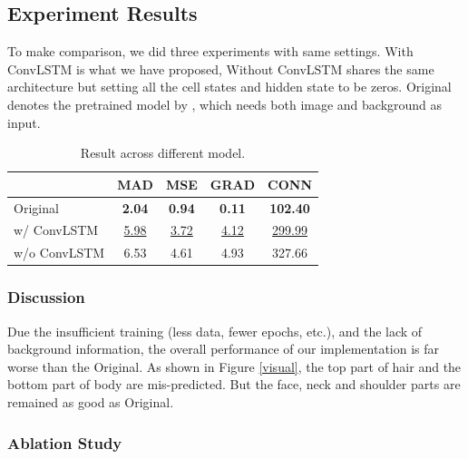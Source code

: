\documentclass[final]{cvpr}
\begin{document}
\subsection{Experiment Results}

To make comparison, we did three experiments with same settings.
With ConvLSTM is what we have proposed, Without ConvLSTM shares the same architecture but setting all the cell states and hidden state to be zeros. Original denotes the pretrained model by \cite{linRealTimeHighResolutionBackground2020a}, which needs both image and background as input.

\begin{table}[h]
    \centering
    \caption{Result across different model.}
    \label{result}
    \begin{tabular}{lcccc}
        \toprule
        {}           & MAD              & MSE              & GRAD             & CONN               \\
        \midrule
        Original     & \textbf{2.04}    & \textbf{0.94}    & \textbf{0.11}    & \textbf{102.40}    \\
        \midrule
        w/ ConvLSTM  & \underline{5.98} & \underline{3.72} & \underline{4.12} & \underline{299.99} \\
        w/o ConvLSTM & 6.53             & 4.61             & 4.93             & 327.66             \\
        \bottomrule
    \end{tabular}
\end{table}

\subsubsection{Discussion}

Due the insufficient training (less data, fewer epochs, etc.), and the lack of background information, the overall performance of our implementation is far worse than the Original.
As shown in Figure \ref{visual}, the top part of hair and the bottom part of body are mis-predicted.
But the face, neck and shoulder parts are remained as good as Original.

\subsubsection{Ablation Study}
\end{document}
